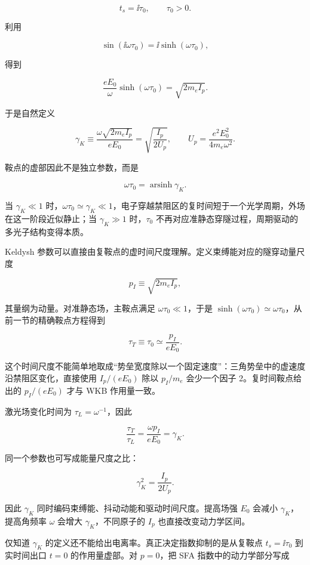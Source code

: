 \[
t_s=\ii\tau_0,
\qquad \tau_0>0.
\]

利用

\[
\sin(\ii\omega\tau_0)
=\ii\sinh(\omega\tau_0),
\]

得到

\[
\frac{eE_0}{\omega}\sinh(\omega\tau_0)
=\sqrt{2m_eI_p}.
\]

于是自然定义

\begin{equation}
\gamma_K
\equiv
\frac{\omega\sqrt{2m_eI_p}}{eE_0}
=\sqrt{\frac{I_p}{2U_p}},
\qquad
U_p=\frac{e^2E_0^2}{4m_e\omega^2}.
\label{eq:keldysh}
\end{equation}

鞍点的虚部因此不是独立参数，而是

\begin{equation}
\omega\tau_0=\operatorname{arsinh}\gamma_K.
\label{eq:keldysh-imag-time}
\end{equation}

当 \(\gamma_K\ll1\) 时，\(\omega\tau_0\simeq\gamma_K\ll1\)，电子穿越禁阻区的复时间短于一个光学周期，外场在这一阶段近似静止；当 \(\gamma_K\gg1\) 时，\(\tau_0\) 不再对应准静态穿隧过程，周期驱动的多光子结构变得本质。

Keldysh 参数可以直接由复鞍点的虚时间尺度理解。定义束缚能对应的隧穿动量尺度

\[
p_I\equiv\sqrt{2m_eI_p},
\]

其量纲为动量。对准静态场，主鞍点满足 \(\omega\tau_0\ll1\)，于是 \(\sinh(\omega\tau_0)\simeq\omega\tau_0\)，从前一节的精确鞍点方程得到

\[
\tau_T\equiv\tau_0\simeq\frac{p_I}{eE_0}.
\]

这个时间尺度不能简单地取成``势垒宽度除以一个固定速度''：三角势垒中的虚速度沿禁阻区变化，直接使用 \(I_p/(eE_0)\) 除以 \(p_I/m_e\) 会少一个因子 2。复时间鞍点给出的 \(p_I/(eE_0)\) 才与 WKB 作用量一致。

激光场变化时间为 \(\tau_L=\omega^{-1}\)，因此

\[
\frac{\tau_T}{\tau_L}
=\frac{\omega p_I}{eE_0}
=\gamma_K.
\]

同一个参数也可写成能量尺度之比：

\[
\gamma_K^2=\frac{I_p}{2U_p}.
\]

因此 \(\gamma_K\) 同时编码束缚能、抖动动能和驱动时间尺度。提高场强 \(E_0\) 会减小 \(\gamma_K\)，提高角频率 \(\omega\) 会增大 \(\gamma_K\)，不同原子的 \(I_p\) 也直接改变动力学区间。

仅知道 \(\gamma_K\) 的定义还不能给出电离率。真正决定指数抑制的是从复鞍点 \(t_s=\ii\tau_0\) 到实时间出口 \(t=0\) 的作用量虚部。对 \(p=0\)，把 SFA 指数中的动力学部分写成

